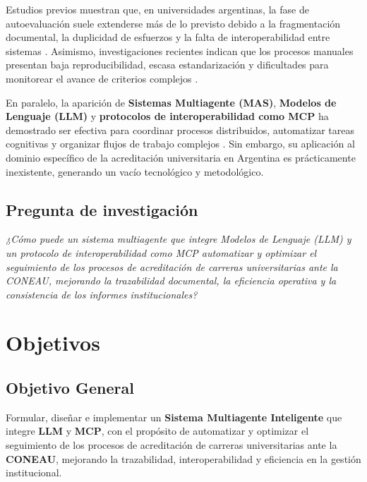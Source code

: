 \documentclass[12pt]{article}
\let\cite\citep
\begin{document}
Estudios previos muestran que, en universidades argentinas, la fase de autoevaluación suele extenderse más de lo previsto debido a la fragmentación documental, la duplicidad de esfuerzos y la falta de interoperabilidad entre sistemas \cite{sanchez2022acreditacion,duarte2023literature}.  
Asimismo, investigaciones recientes indican que los procesos manuales presentan baja reproducibilidad, escasa estandarización y dificultades para monitorear el avance de criterios complejos \cite{tortosasistemas}.

En paralelo, la aparición de \textbf{Sistemas Multiagente (MAS)}, \textbf{Modelos de Lenguaje (LLM)} y \textbf{protocolos de interoperabilidad como MCP} ha demostrado ser efectiva para coordinar procesos distribuidos, automatizar tareas cognitivas y organizar flujos de trabajo complejos \cite{perez2022breve,sakurada2021multi,farsane2025automatizacion,ehtesham2025survey,agashe2023llm}.  
Sin embargo, su aplicación al dominio específico de la acreditación universitaria en Argentina es prácticamente inexistente, generando un vacío tecnológico y metodológico.

\subsection{Pregunta de investigación}

\textit{¿Cómo puede un sistema multiagente que integre Modelos de Lenguaje (LLM) y un protocolo de interoperabilidad como MCP automatizar y optimizar el seguimiento de los procesos de acreditación de carreras universitarias ante la CONEAU, mejorando la trazabilidad documental, la eficiencia operativa y la consistencia de los informes institucionales?}



\section{Objetivos}

\subsection{Objetivo General}

Formular, diseñar e implementar un \textbf{Sistema Multiagente Inteligente} que integre \textbf{LLM} y \textbf{MCP}, con el propósito de automatizar y optimizar el seguimiento de los procesos de acreditación de carreras universitarias ante la \textbf{CONEAU}, mejorando la trazabilidad, interoperabilidad y eficiencia en la gestión institucional.
\end{document}
